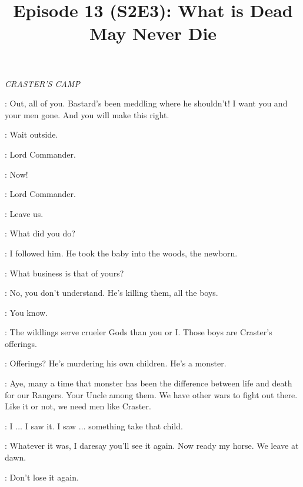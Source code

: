 

\title{Episode 13 (S2E3): What is Dead May Never Die}
\author{}
\date{}
\maketitle




\scene

\textit{CRASTER'S CAMP} 

\CRASTER: Out, all of you. Bastard's been meddling where he shouldn't! I want you and your men gone. And you will make this right. 

\JEOR: Wait outside. 

\JON: Lord Commander. 

\JEOR: Now! 


\JON: Lord Commander. 

\JEOR: Leave us. 


\JEOR: What did you do? 

\JON: I followed him. He took the baby into the woods, the newborn. 

\JEOR: What business is that of yours? 

\JON: No, you don't understand. He's killing them, all the boys. 


\JON: You know. 

\JEOR: The wildlings serve crueler Gods than you or I. Those boys are Craster's offerings. 

\JON: Offerings? He's murdering his own children. He's a monster. 

\JEOR: Aye, many a time that monster has been the difference between life and death for our Rangers. Your Uncle among them. We have other wars to fight out there. Like it or not, we need men like Craster. 

\JON: I $\ldots$ I saw it. I saw $\ldots$ something take that child. 


\JEOR: Whatever it was, I daresay you'll see it again. Now ready my horse. We leave at dawn. 


\JEOR: Don't lose it again. 



